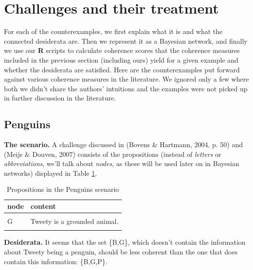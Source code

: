 \documentclass[
  10pt,
]{scrartcl}
\newcommand{\s}[1]{\textsf{#1}}
\begin{document}
\hypertarget{challenges-and-their-treatment}{%
\section{\texorpdfstring{Challenges and their treatment \label{sec:examples}}{Challenges and their treatment }}\label{challenges-and-their-treatment}}

For each of the counterexamples, we first explain what it is and what the connected desiderata are. Then we represent it as a Bayesian network, and finally we use our \textbf{\textsf{R}} scripts to calculate coherence scores that the coherence measures included in the previous section (including ours) yield for a given example and whether the desiderata are satisfied.
Here are the counterexamples put forward against various coherence measures in the literature. We ignored only a few where both we didn't share the authors' intuitions and the examples were not picked up in further discussion in the literature.

\hypertarget{penguins}{%
\subsection{Penguins}\label{penguins}}

\textbf{The scenario.} A challenge discussed in (Bovens \& Hartmann, 2004, p. 50) and (Meijs \& Douven, 2007) consists of the propositions (instead of \emph{letters} or \emph{abbreviations}, we'll talk about \emph{nodes}, as these will be used later on in Bayesian networks) displayed in Table \ref{tab:penguinsPropositions}.

\begin{table}[H]

\caption{\label{tab:penguinsPropositions}Propositions in the Penguins scenario}
\centering
\begin{tabular}[t]{ll}
\toprule
node & content\\
\midrule
\cellcolor{gray!6}{B} & \cellcolor{gray!6}{Tweety is a bird.}\\
G & Tweety is a grounded animal.\\
\cellcolor{gray!6}{P} & \cellcolor{gray!6}{Tweety is a penguin.}\\
\bottomrule
\end{tabular}
\end{table}

\noindent \textbf{Desiderata.}
It seems that the set \{\s{B},\s{G}\}, which doesn't contain the information about Tweety being a penguin, should be less coherent than the one that does contain this information: \{\s{B},\s{G},\s{P}\}.
\end{document}

